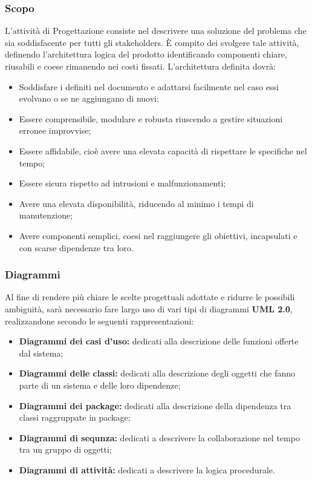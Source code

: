 \documentclass[NormeDiProgetto.tex]{subfiles}
\begin{document}
\subsubsection{Scopo}
L’attività di Progettazione consiste nel descrivere una soluzione del problema
che sia soddisfacente per tutti gli stakeholders.
\`{E} compito dei \progi{} svolgere tale attività, definendo l’architettura logica
del prodotto identificando componenti chiare, riusabili e coese rimanendo nei
costi fissati. L’architettura definita dovrà:
\begin{itemize}
	\item Soddisfare i  definiti nel documento \adr{} e adattarsi facilmente nel caso essi evolvano o se ne aggiungano di nuovi; 
	\item Essere comprensibile, modulare e robusta riuscendo a gestire situazioni erronee improvvise;
	\item Essere affidabile, cioè avere una elevata capacità di rispettare le specifiche nel tempo;
	\item Essere sicura rispetto ad intrusioni e malfunzionamenti;
	\item Avere una elevata disponibilità, riducendo al minimo i tempi di manutenzione;
	\item Avere componenti semplici, coesi nel raggiungere gli obiettivi, incapsulati e con scarse dipendenze tra loro.
\end{itemize}

\subsubsection{Diagrammi}
Al fine di rendere più chiare le scelte progettuali adottate e
ridurre le possibili ambiguità, sarà necessario fare largo uso di vari tipi di diagrammi 
\textbf{UML 2.0}, realizzandone secondo le seguenti rappresentazioni:
\begin{itemize}
	\item \textbf{Diagrammi dei casi d'uso:} dedicati alla descrizione delle funzioni offerte dal sistema;
	\item \textbf{Diagrammi delle classi:} dedicati alla descrizione degli oggetti che fanno parte di un sistema e delle loro dipendenze;
	\item \textbf{Diagrammi dei package:} dedicati alla descrizione della dipendenza tra classi raggruppate in package;
	\item \textbf{Diagrammi di sequnza:} dedicati a descrivere la collaborazione nel tempo tra un gruppo di oggetti;
	\item \textbf{Diagrammi di attività:} dedicati a descrivere la logica procedurale.
\end{itemize}
\end{document}
